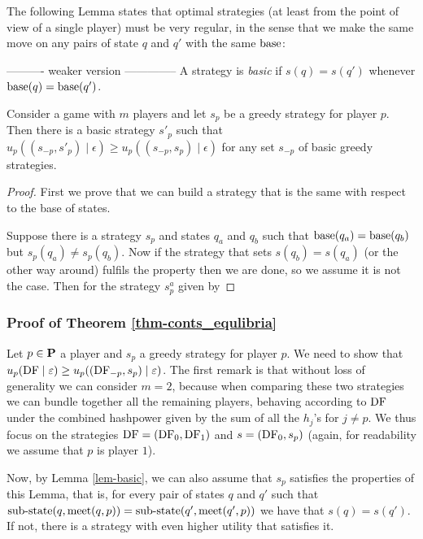 The following Lemma states that optimal strategies (at least from the point of view of a single player) must be very regular, in the sense that 
we make the same move on any pairs of state $q$ and $q'$ with the same $\text{\rm base}$: 

---------- weaker version --------------
A strategy is \emph{basic} if $s(q) = s(q')$ whenever $\text{\rm base}(q) = \text{\rm base}(q')$. 
\begin{mylem}
\label{lem-basic}
Consider a game with $m$ players and let $s_p$ be a greedy strategy for player $p$. Then there is a basic strategy $s'_p$ such that $u_p((s_{-p},s'_p) \mid \epsilon) \geq u_p((s_{-p},s_p) \mid \epsilon)$ for any set $s_{-p}$ of basic greedy strategies.  
\end{mylem}
\begin{proof}

First we prove that we can build a strategy that is the same with respect to the base of states. 

Suppose there is a strategy $s_p$ and states $q_a$ and $q_b$ such that $\text{\rm base}(q_a) = \text{\rm base}(q_b)$ but 
$s_p(q_a) \neq s_p(q_b)$. Now if the strategy that sets $s(q_b) = s(q_a)$ (or the other way around) fulfils the property then 
we are done, so we assume it is not the case. 
Then for the strategy $s_p^a$ given by 
\end{proof}





\subsubsection{Proof of Theorem \ref{thm-conts_equlibria}} 

Let $p \in \mathbf{P}$ a player and $s_p$ a greedy strategy for player $p$. We need to show that 
$u_p(\text{\rm DF} \mid \varepsilon) \geq u_p( (\text{\rm DF}_{-p},s_p) \mid \varepsilon)$. The first remark is that without loss of generality we can consider 
$m = 2$, because when comparing these two strategies we can bundle together all the remaining players, behaving according to $\text{\rm DF}$ 
under the combined hashpower given by the sum of all the $h_j$'s for $j \neq p$. We thus focus on the strategies 
$\text{\rm DF} = (\text{\rm DF}_0,\text{\rm DF}_1)$ and $s = (\text{\rm DF}_0,s_p)$ (again, for readability we assume that $p$ is player $1$). 

Now, by Lemma \ref{lem-basic}, we can also assume that $s_p$ satisfies the properties of this Lemma, that is, for every 
pair of states $q$ and $q'$ such that ${\text{\rm sub-state}}(q,\text{\rm meet}(q,p)) = {\text{\rm sub-state}}(q',\text{\rm meet}(q',p))$ we have that $s(q) = s(q')$. If not, there is a strategy with even higher utility that satisfies it. 

